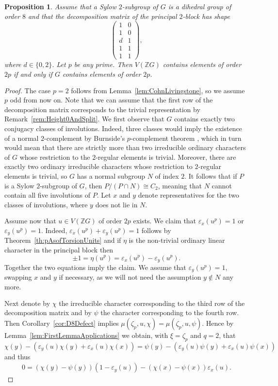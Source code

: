 \documentclass[11pt, a4paper]{amsart}
\newtheorem{proposition}[theorem]{Proposition}
\theoremstyle{definition}
\theoremstyle{definition}
\begin{document}
\begin{proposition}\label{prop:ApplicationD8}
Assume that a Sylow $2$-subgroup of $G$ is a dihedral group of order $8$ and that the decomposition matrix of the principal $2$-block has shape
\[\begin{pmatrix} 1 & 0 \\ 1 & 0 \\ d & 1 \\ 1 & 1 \\ 1 & 1  \end{pmatrix}, \]
where $d \in \{0,2 \}$. %
Let $p$ be any prime. Then $V(\mathbb{Z}G)$ contains elements of order $2p$ if and only if $G$ contains elements of order $2p$.
\end{proposition}
\begin{proof}
The case $p=2$ follows from Lemma~\ref{lem:CohnLivingstone}, so we assume $p$ odd from now on. Note that we can assume that the first row of the decomposition matrix corresponds to the trivial representation by Remark~\ref{rem:Height0AndSplit}.
We first observe that $G$ contains exactly two conjugacy classes of involutions. Indeed, three classes would imply the existence of a normal $2$-complement by Burnside's $p$-complement theorem \cite[IV, Hauptsatz 2.6]{HuppertI}, which in turn would mean that there are strictly more than two irreducible ordinary characters of $G$ whose restriction to the $2$-regular elements is trivial. Moreover, there are exactly two ordinary irreducible characters whose restriction to $2$-regular elements is trivial, so $G$ has a normal subgroup $N$ of index $2$. It follows that if $P$ is a Sylow $2$-subgroup of $G$, then $P/(P\cap N) \cong C_2$, meaning that $N$ cannot contain all five involutions of $P$. Let $x$ and $y$ denote representatives for the two classes of involutions, where $y$ does not lie in $N$.

Assume now that $u \in V(\mathbb{Z}G)$ of order $2p$ exists. We claim that $\varepsilon_x(u^p) = 1$ or $\varepsilon_y(u^p) = 1$. Indeed, $\varepsilon_x(u^p) + \varepsilon_y(u^p)=1$ follows by Theorem~\ref{th:pAsofTorsionUnits} and if $\eta$ is the non-trivial ordinary linear character  in the principal block then 
\[\pm 1 = \eta(u^p) = \varepsilon_x(u^p) - \varepsilon_y(u^p).\]
Together the two equations imply the claim. We assume that $\varepsilon_y(u^p) = 1$, swapping $x$ and $y$ if necessary, as we will not need the assumption $y \notin N$ any more.

Next denote by $\chi$ the irreducible character corresponding to the third row of the decomposition matrix and by $\psi$ the character corresponding to the fourth row. Then Corollary~\ref{cor:D8Defect} implies $\mu(\zeta_p, u, \chi) = \mu(\zeta_p, u, \psi)$. Hence by Lemma~\ref{lem:FirstLemmaApplications} we obtain, with $\xi = \zeta_p$ and $q=2$, that
\[ \chi(y) - (\varepsilon_y(u)\chi(y) + \varepsilon_x(u)\chi(x)) = \psi(y) - (\varepsilon_y(u)\psi(y) + \varepsilon_x(u)\psi(x)) \]
and thus
\begin{align}\label{eq:ApplicationLemmaForD8}
0 = (\chi(y)-\psi(y))(1-\varepsilon_y(u)) - (\chi(x)-\psi(x))\varepsilon_x(u).
\end{align}


\end{proof}
\end{document}
